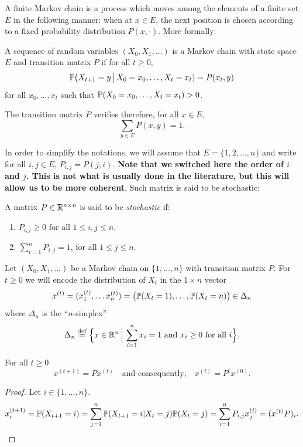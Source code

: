 \documentclass[11pt,nocut]{article}
\begin{document}
A finite Markov chain is a process which moves among the elements of a finite set $E$ in the following manner: when at $x \in E$, the next position is chosen according to a fixed probability distribution $P(x, \cdot)$. More formally:

\begin{definition}
	A sequence of random variables $(X_0, X_1, \dots)$ is a Markov chain with state space $E$ and transition matrix $P$ if for all $t \geq 0$, 
	$$
	\P\big( X_{t+1} = y \, \big| \, X_0= x_0, \dots, X_t = x_t ) = P(x_t,y)
	$$
	for all $x_0, \dots, x_t$ such that $\P(X_0 = x_0, \dots, X_t = x_t) >0$.
\end{definition}

The transition matrix $P$ verifies therefore, for all $x \in E$,
\begin{equation}
	\sum_{y \in E} P(x,y) = 1.
\end{equation}

In order to simplify the notations, we will assume that $E = \{1,2, \dots, n\}$ and write for all $i,j \in E$, $P_{i,j} = P(j,i)$. 
\textbf{Note that we switched here the order of $i$ and $j$. This is not what is usually done in the literature, but this will allow us to be more coherent}.
Such matrix is said to be stochastic:

\begin{definition}
	A matrix $P \in \R^{n \times n}$ is said to be \emph{stochastic} if:
	\begin{enumerate}[label=(\roman*),noitemsep]
		\item $P_{i,j} \geq 0$ for all $1 \leq i,j \leq n$.
		\item $\sum\limits_{i=1}^n P_{i,j} = 1$, for all $1 \leq j \leq n$.
	\end{enumerate}
\end{definition}

Let $(X_0, X_1, \dots)$ be a Markov chain on $\{1, \dots, n\}$ with transition matrix $P$. For $t \geq 0$ we will encode the distribution of $X_t$ in the $1 \times n$ vector
$$
x^{(t)} = (x^{(t)}_1, \dots x^{(t)}_n) 
= \big(\P(X_t = 1), \dots, \P(X_t = n)\big) \in \Delta_n
$$
where $\Delta_n$ is the ``$n$-simplex''
$$
\Delta_n \defeq \Big\{ x \in \R^n \, \Big| \, \sum_{i=1}^n x_i = 1 \ \text{and} \ x_i \geq 0 \ \text{for all} \ i \Big\}.
$$


\begin{proposition}
	For all $t \geq 0$
	$$
	x^{(t+1)} = P x^{(t)}
	\quad \text{and consequently,} \quad
	x^{(t)} =  P^t x^{(0)}.
	$$
\end{proposition}
\begin{proof} Let $i \in \{1,\dots, n\}$.
	\begin{align*}
		x^{(t+1)}_i
		= \P(X_{t+1}=i)
		= \sum_{j=1}^n \P(X_{t+1}=i|X_t = j) \P(X_t = j)
		= \sum_{i=1}^n P_{i,j} x^{(t)}_j
		= (x^{(t)} P)_i.
	\end{align*}
\end{proof}
\end{document}
